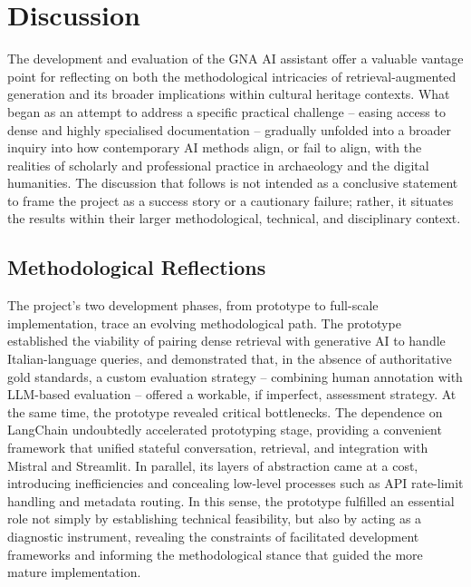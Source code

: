 \chapter{Discussion}
\label{chap:discussion}
\begin{spacing}{1.5}
The development and evaluation of the GNA AI assistant offer a valuable vantage point for reflecting on both the methodological intricacies of retrieval-augmented generation and its broader implications within cultural heritage contexts. What began as an attempt to address a specific practical challenge -- easing access to dense and highly specialised documentation -- gradually unfolded into a broader inquiry into how contemporary AI methods align, or fail to align, with the realities of scholarly and professional practice in archaeology and the digital humanities. The discussion that follows is not intended as a conclusive statement to frame the project as a success story or a cautionary failure; rather, it situates the results within their larger methodological, technical, and disciplinary context.

\section{Methodological Reflections}
The project’s two development phases, from prototype to full-scale implementation, trace an evolving methodological path. The prototype established the viability of pairing dense retrieval with generative AI to handle Italian-language queries, and demonstrated that, in the absence of authoritative gold standards, a custom evaluation strategy -- combining human annotation with LLM-based evaluation -- offered a workable, if imperfect, assessment strategy. At the same time, the prototype revealed critical bottlenecks. The dependence on LangChain undoubtedly accelerated prototyping stage, providing a convenient framework that unified stateful conversation, retrieval, and integration with Mistral and Streamlit. In parallel, its layers of abstraction came at a cost, introducing inefficiencies and concealing low-level processes such as API rate-limit handling and metadata routing. In this sense, the prototype fulfilled an essential role not simply by establishing technical feasibility, but also by acting as a diagnostic instrument, revealing the constraints of facilitated development frameworks and informing the methodological stance that guided the more mature implementation.


\end{spacing}
